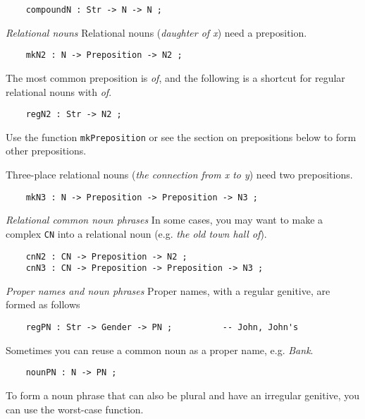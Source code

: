 \documentclass[11pt,a4paper]{article}
\newcommand{\subsubsubsection}[1]{\textit{#1}}
\begin{document}
\begin{verbatim}
    compoundN : Str -> N -> N ;
\end{verbatim}

\subsubsubsection{Relational nouns}
Relational nouns (\textit{daughter of x}) need a preposition. 

\begin{verbatim}
    mkN2 : N -> Preposition -> N2 ;
\end{verbatim}

The most common preposition is \textit{of}, and the following is a
shortcut for regular relational nouns with \textit{of}.

\begin{verbatim}
    regN2 : Str -> N2 ;
\end{verbatim}

Use the function \texttt{mkPreposition} or see the section on prepositions below to  
form other prepositions.

Three-place relational nouns (\textit{the connection from x to y}) need two prepositions.

\begin{verbatim}
    mkN3 : N -> Preposition -> Preposition -> N3 ;
\end{verbatim}

\subsubsubsection{Relational common noun phrases}
In some cases, you may want to make a complex \texttt{CN} into a
relational noun (e.g. \textit{the old town hall of}).

\begin{verbatim}
    cnN2 : CN -> Preposition -> N2 ;
    cnN3 : CN -> Preposition -> Preposition -> N3 ;
\end{verbatim}

\subsubsubsection{Proper names and noun phrases}
Proper names, with a regular genitive, are formed as follows

\begin{verbatim}
    regPN : Str -> Gender -> PN ;          -- John, John's
\end{verbatim}

Sometimes you can reuse a common noun as a proper name, e.g. \textit{Bank}.

\begin{verbatim}
    nounPN : N -> PN ;
\end{verbatim}

To form a noun phrase that can also be plural and have an irregular
genitive, you can use the worst-case function.
\end{document}
